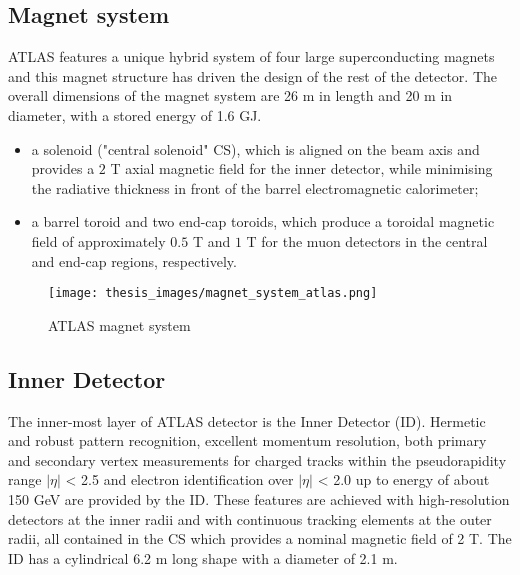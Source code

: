 \documentclass[a4paper, oneside, 11pt, openright]{book}
\begin{document}
			\subsection{Magnet system}
				ATLAS features a unique hybrid system of four large superconducting magnets and this magnet structure has driven the design of the rest of the detector. The overall dimensions of the magnet system are 26 m in length and 20 m in diameter, with a stored energy of 1.6 GJ.
				\begin{itemize}
					\item a solenoid ("central solenoid" CS), which is aligned on the beam axis and provides a $2$ T axial magnetic field for the inner detector,  while minimising the radiative thickness in front of the barrel electromagnetic calorimeter;
					\item a  barrel  toroid and  two  end-cap  toroids, which  produce  a toroidal magnetic field of approximately $0.5$ T and $1$ T for the muon detectors in the central and end-cap regions, respectively.
				\end{itemize}
			
				\begin{figure}[H]
					\centering
					\texttt{[image: thesis\_images/magnet\_system\_atlas.png]}
					\caption{ATLAS magnet system}
				\end{figure}
			
			\subsection{Inner Detector}
				The inner-most layer of ATLAS detector is the Inner Detector (ID). Hermetic and robust pattern recognition, excellent momentum resolution, both primary and secondary vertex measurements for charged tracks within the pseudorapidity range $|\eta|$ < 2.5 and electron identification over $|\eta|$ < 2.0 up to energy of about 150 GeV are provided by the ID. These features are achieved with high-resolution detectors at the inner radii and  with continuous tracking elements at the outer radii, all contained in the CS which provides a nominal magnetic field of 2 T. The ID has a cylindrical 6.2 m long shape with a diameter of 2.1 m.
				
\end{document}
